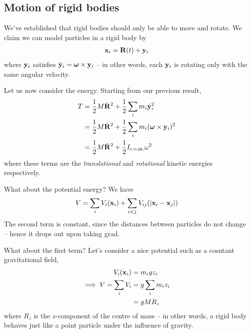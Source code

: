 \documentclass{../template/note}
\begin{document}
    \subsection{Motion of rigid bodies}

    We've established that rigid bodies should only be able to move and rotate. We claim we can model particles in a rigid body by
    \begin{align*}
        \V x_i = \V R(t) + \V y_i
    \end{align*}
    where \(\V y_i\) satisfies \(\dot{\V y}_i = \V \omega \times \V y_i\) -- in other words, each \(\V y_i\) is rotating only with the same angular velocity.
    
    Let us now consider the energy. Starting from our previous result,
    \begin{align*}
        T &= \frac 1 2 M \dot{\V R}^2 + \frac 1 2 \sum_i m_i \dot{\V y}_i^2 \\
        &= \frac 1 2 M \dot{\V R}^2 + \frac 1 2 \sum_i m_i (\V \omega \times \V y_i)^2 \\
        &= \frac 1 2 M \dot{\V R}^2 + \frac 1 2 I_\text{c.o.m.}\omega^2
    \end{align*}
    where these terms are the \emph{translational} and \emph{rotational} kinetic energies respectively.
    
    What about the potential energy? We have
    \begin{align*}
        V = \sum_i V_i(\V x_i) + \sum_{i < j}V_{ij}(|\V x_i - \V x_j|)
    \end{align*}
    The second term is constant, since the distances between particles do not change -- hence it drops out upon taking grad.

    What about the first term? Let's consider a nice potential such as a cosntant gravitational field,
    \begin{align*}
        V_i(\V x_i) &= m_igz_i \\
        \implies V = \sum_i V_i &= g \sum_i m_iz_i \\
        &= gMR_z
    \end{align*}
    where \(R_z\) is the \(z\)-component of the centre of mass -- in other words, a rigid body behaves just like a point particle under the influence of gravity.
\end{document}
